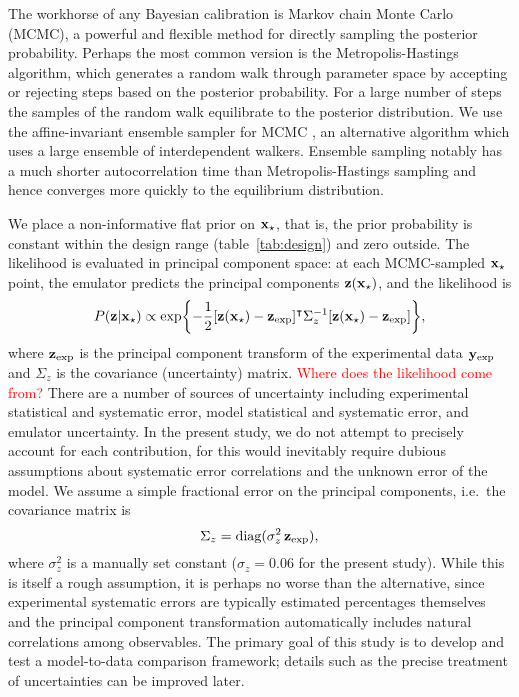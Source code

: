 \documentclass[aps,prc,reprint,superscriptaddress,amsmath]{revtex4-1}
\newcommand{\todo}[1]{\textcolor{red}{#1}}
\newcommand{\tran}{^\intercal}
\begin{document}
The workhorse of any Bayesian calibration is Markov chain Monte Carlo (MCMC), a powerful and flexible method for directly sampling the posterior probability.
Perhaps the most common version is the Metropolis-Hastings algorithm, which generates a random walk through parameter space by accepting or rejecting steps based on the posterior probability.
For a large number of steps the samples of the random walk equilibrate to the posterior distribution.
We use the affine-invariant ensemble sampler for MCMC \cite{Goodman:2010en,FM:2013mc}, an alternative algorithm which uses a large ensemble of interdependent walkers.
Ensemble sampling notably has a much shorter autocorrelation time than Metropolis-Hastings sampling and hence converges  more quickly to the equilibrium distribution. 

We place a non-informative flat prior on $\mathbf x_\star$, that is, the prior probability is constant within the design range (table~\ref{tab:design}) and zero outside.
The likelihood is evaluated in principal component space:
at each MCMC-sampled $\mathbf x_\star$ point, the emulator predicts the principal components $\mathbf z(\mathbf x_\star)$, and the likelihood is
\begin{equation}
  P(\z|\xs) \propto \exp\biggl\{ -\frac{1}{2} [\z(\xs) - \zexp]\tran \Sigma_z^{-1} [\z(\xs) - \zexp] \biggr\},
  \label{eq:likelihood}
\end{equation}
where $\mathbf z_\text{exp}$ is the principal component transform of the experimental data $\mathbf y_\text{exp}$ and $\Sigma_z$ is the covariance (uncertainty) matrix.
\todo{Where does the likelihood come from?}
There are a number of sources of uncertainty including experimental statistical and systematic error, model statistical and systematic error, and emulator uncertainty.
In the present study, we do not attempt to precisely account for each contribution, for this would inevitably require dubious assumptions about systematic error correlations and the unknown error of the model.
We assume a simple fractional error on the principal components, i.e.\ the covariance matrix is
\begin{equation}
  \Sigma_z = \text{diag}(\sigma^2_z\,\mathbf z_\text{exp}),
\end{equation}
where $\sigma^2_z$ is a manually set constant ($\sigma_z = 0.06$ for the present study).
While this is itself a rough assumption, it is perhaps no worse than the alternative, since experimental systematic errors are typically estimated percentages themselves and the principal component transformation automatically includes natural correlations among observables.
The primary goal of this study is to develop and test a model-to-data comparison framework; details such as the precise treatment of uncertainties can be improved later.
\end{document}
